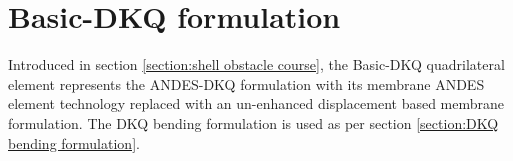 
\chapter{Basic-DKQ formulation}
\label{sec:Basic-DKQ quadrilateral formulation}
\renewcommand{\Thema}{Basic-DKQ quadrilateral formulation}

Introduced in section \ref{section:shell obstacle course}, the Basic-DKQ quadrilateral element represents the ANDES-DKQ formulation with its membrane ANDES element technology replaced with an un-enhanced displacement based membrane formulation. The DKQ bending formulation is used as per section \ref{section:DKQ bending formulation}.

